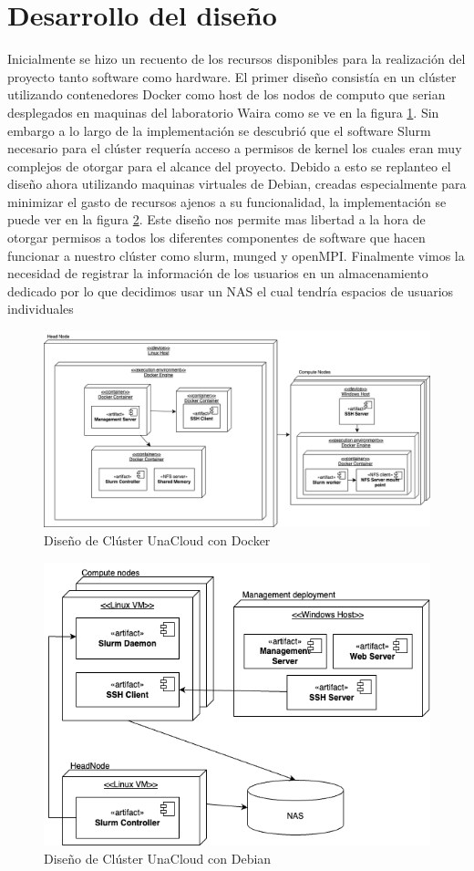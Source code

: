 \section{Desarrollo del diseño}
Inicialmente se hizo un recuento de los recursos disponibles para la realización del proyecto tanto software como hardware. El primer diseño consistía en un clúster utilizando contenedores Docker como host de los nodos de computo que serian desplegados en maquinas del laboratorio Waira como se ve en la figura \ref{fig:minihypatia}. Sin embargo a lo largo de la implementación se descubrió que el software Slurm necesario para el clúster requería acceso a permisos de kernel los cuales eran muy complejos de otorgar para el alcance del proyecto. Debido a esto se replanteo el diseño ahora utilizando maquinas virtuales de Debian, creadas especialmente para minimizar el gasto de recursos ajenos a su funcionalidad, la implementación se puede ver en la figura \ref{fig:minihypatiadeb}. Este diseño nos permite mas libertad a la hora de otorgar permisos a todos los diferentes componentes de software que hacen funcionar a nuestro clúster como slurm, munged y openMPI. Finalmente vimos la necesidad de registrar la información de los usuarios en un almacenamiento dedicado por lo que decidimos usar un NAS el cual tendría espacios de usuarios individuales

\begin{figure}[H]
    \centering
    \includegraphics[width=0.75\linewidth]{Documento Final/Imagenes/MiniHypatia(1)-General Deployment.png}
    \caption{Diseño de Clúster UnaCloud con Docker}
    \label{fig:minihypatia}
\end{figure}

\begin{figure}[H]
    \centering
    \includegraphics[width=0.75\linewidth]{Documento Final/Imagenes/dep.drawio.png}
    \caption{Diseño de Clúster UnaCloud con Debian}
    \label{fig:minihypatiadeb}
\end{figure}

